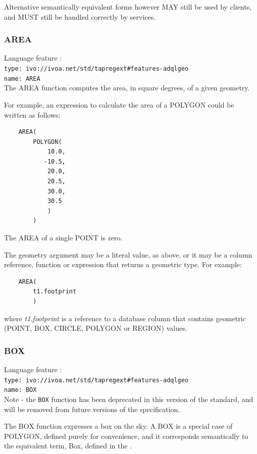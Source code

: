 \documentclass[11pt,a4paper]{ivoa}
\begin{document}
Alternative semantically equivalent forms however MAY still be
used by clients, and MUST still be handled correctly by services.

\subsubsection{AREA}
\label{sec:functions.geom.area}
{\footnotesize Language feature :}\\
{\footnotesize \verb|type: ivo://ivoa.net/std/tapregext#features-adqlgeo|}\\
{\footnotesize \verb|name: AREA|}\\

The AREA function computes the area, in square degrees, of a given geometry.

For example, an expression to calculate the area of a POLYGON could be
written as follows:
\begin{verbatim}
    AREA(
        POLYGON(
            10.0,
           -10.5,
            20.0,
            20.5,
            30.0,
            30.5
            )
        )
\end{verbatim}

The AREA of a single POINT is zero.

The geometry argument may be a literal value, as above, or it may be a
column reference, function or expression that returns a geometric type.
For example:
\begin{verbatim}
    AREA(
        t1.footprint
        )
\end{verbatim}
where \textit{t1.footprint} is a reference to a database column that
contains geometric (POINT, BOX, CIRCLE, POLYGON or REGION) values.

\subsubsection{BOX}
\label{sec:functions.geom.box}
{\footnotesize Language feature :}\\
{\footnotesize \verb|type: ivo://ivoa.net/std/tapregext#features-adqlgeo|}\\
{\footnotesize \verb|name: BOX|}\\

Note - the \verb|BOX| function has been deprecated in this version of the standard,
and will be removed from future versions of the specification.

The BOX function expresses a box on the sky. A BOX is a special case of POLYGON,
defined purely for convenience,
and it corresponds semantically to the equivalent term, Box, defined in
the \STCSpec{}.
\end{document}
